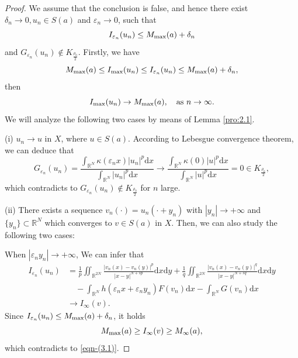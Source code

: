 \documentclass[reqno]{amsart}
\begin{document}
\begin{proof}
We assume that the conclusion is false, and hence there exist 
$\delta_n \to 0, u_n \in S(a)$ and $\varepsilon_n \to 0$, such that
$$
I_{\varepsilon_n }(u_n)\le M_{\rm max}(a)+\delta_n
$$
and
$G_{\varepsilon_n}(u_n)\not\in K_{\frac{\rho_0}{2}}$.
Firstly, we have
$$
M_{\rm max}(a)\le I_{\rm max}(u_n)\le I_{\varepsilon_n }(u_n)
\le M_{\rm max}(a)+\delta_n,
$$
then
$$
I_{\rm max}(u_n)\to M_{\rm max}(a),\quad \text{as } n\to\infty.
$$
We will analyze the following two cases by means of Lemma \ref{pro:2.1}.

(i) $u_n\to u$ in $X$, where $u\in S(a)$. According to Lebesgue convergence 
theorem, we can deduce that
$$
G_{\varepsilon_n}(u_n)=\frac{\int_{\mathbb{R}^N}\kappa(\varepsilon_n x)|u_n|^{p}
\mathrm{d}x}{\int_{\mathbb{R}^N}|u_n|^{p}\mathrm{d}x}
\to\frac{\int_{\mathbb{R}^N}\kappa(0)|u|^{p}\mathrm{d}x}{\int_{\mathbb{R}^N}
|u|^{p}\mathrm{d}x}=0\in K_{\frac{\rho_0}{2}},
$$
which contradicts to $G_{\varepsilon_n}(u_n)\not\in K_{\frac{\rho_0}{2}}$ 
for $n$ large.

(ii) There exists a sequence $v_n(\cdot)=u_n(\cdot+y_n)$ with $|y_n|\to+\infty$ and 
$\{y_n\}\subset \mathbb{R}^N$ which converges to $v \in S(a)$ in $X$.
Then, we can also study the following two cases:

When $|\varepsilon_n y_n|\to+\infty$, We can infer that
\begin{align*}
 I_{\varepsilon_n}(u_n)
&= \frac{1}{p}\iint_{\mathbb{R}^{2N}}\frac{|v_n(x)-v_n(y)|^{p}}{|x-y|^{N+sp}}
 \mathrm{d}x\mathrm{d}y+\frac{1}{q}\iint_{\mathbb{R}^{2N}}\frac{|v_n(x)
 -v_n(y)|^{q}}{|x-y|^{N+sq}}\mathrm{d}x\mathrm{d}y\\
&\quad -\int_{\mathbb{R}^N}h(\varepsilon_n x+\varepsilon_n y_n)F(v_n)\mathrm{d}x
  -\int_{\mathbb{R}^N}G(v_n)\mathrm{d}x\\
&\to I_\infty(v).
 \end{align*}
Since $I_{\varepsilon_n}(u_n)\le M_{\rm max}(a)+\delta_n$, it holds
$$
M_{\rm max}(a)\ge I_\infty(v)\ge M_\infty(a),
$$
which contradicts to \eqref{eqn-(3.1)}.


\end{proof}
\end{document}
